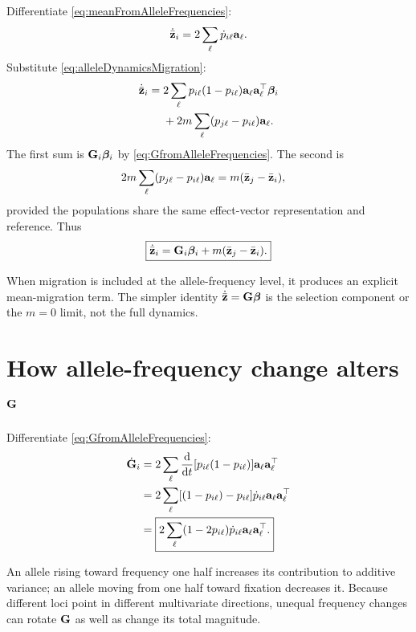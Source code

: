 Differentiate \cref{eq:meanFromAlleleFrequencies}:
\begin{equation}
\dot{\bar{\mathbf z}}_i=2\sum_\ell\dot p_{i\ell}\mathbf a_\ell.
\end{equation}
Substitute \cref{eq:alleleDynamicsMigration}:
\begin{align}
\dot{\bar{\mathbf z}}_i
={}&2\sum_\ell p_{i\ell}(1-p_{i\ell})
\mathbf a_\ell\mathbf a_\ell^\top\boldsymbol{\beta}_i\\
&+2m\sum_\ell(p_{j\ell}-p_{i\ell})\mathbf a_\ell.
\end{align}
The first sum is \(\mathbf{G}_i\boldsymbol{\beta}_i\) by \cref{eq:GfromAlleleFrequencies}. The second is
\begin{align}
2m\sum_\ell(p_{j\ell}-p_{i\ell})\mathbf a_\ell
&=m(\bar{\mathbf z}_j-\bar{\mathbf z}_i),
\end{align}
provided the populations share the same effect-vector representation and reference. Thus
\begin{equation}
\boxed{
\dot{\bar{\mathbf z}}_i
=\mathbf{G}_i\boldsymbol{\beta}_i+m(\bar{\mathbf z}_j-\bar{\mathbf z}_i).}
\label{eq:LandeWithMigration}
\end{equation}

\begin{cautionbox}
When migration is included at the allele-frequency level, it produces an explicit mean-migration term. The simpler identity \(\dot{\bar{\mathbf z}}=\mathbf{G}\boldsymbol{\beta}\) is the selection component or the \(m=0\) limit, not the full dynamics.
\end{cautionbox}

\section{How allele-frequency change alters \(\mathbf{G}\)}

Differentiate \cref{eq:GfromAlleleFrequencies}:
\begin{align}
\dot{\mathbf{G}}_i
&=2\sum_\ell\frac{\mathrm d}{\mathrm d t}
[p_{i\ell}(1-p_{i\ell})]
\mathbf a_\ell\mathbf a_\ell^\top\\
&=2\sum_\ell[(1-p_{i\ell})-p_{i\ell}]\dot p_{i\ell}
\mathbf a_\ell\mathbf a_\ell^\top\\
&=\boxed{
2\sum_\ell(1-2p_{i\ell})\dot p_{i\ell}
\mathbf a_\ell\mathbf a_\ell^\top.}
\label{eq:GdotAlleles}
\end{align}

\inwords An allele rising toward frequency one half increases its contribution to additive variance; an allele moving from one half toward fixation decreases it. Because different loci point in different multivariate directions, unequal frequency changes can rotate \(\mathbf{G}\) as well as change its total magnitude.

